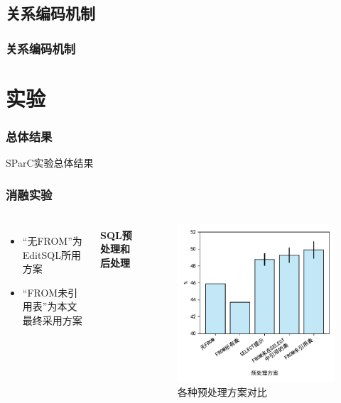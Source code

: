 \documentclass{ctexbeamer}
\begin{document}
\subsection{关系编码机制}
\begin{frame}
  \frametitle{关系编码机制}
\end{frame}

\section{实验}
\begin{frame}
  \frametitle{总体结果}
  \begin{table}
    
    \caption{SParC实验总体结果}
  \end{table}
\end{frame}
\begin{frame}
  \frametitle{消融实验}
  \begin{columns}
    \begin{itemize}
      \item “无FROM”为EditSQL所用方案
      \item “FROM未引用表”为本文最终采用方案
    \end{itemize}
    \framesubtitle{SQL预处理和后处理}
    \begin{figure}
      \includegraphics[height=0.68\textheight]{figure/preprocess.pdf}
      \caption{各种预处理方案对比}
    \end{figure}
  \end{columns}
\end{frame}
\end{document}
